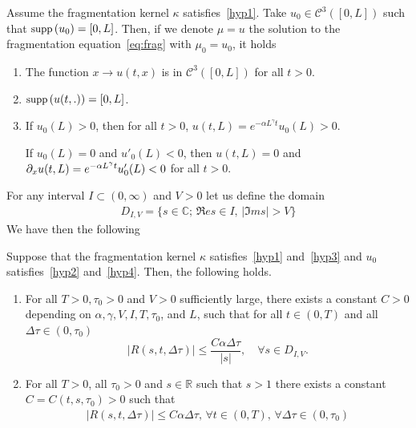 \documentclass[AHL,Unicode,longabstracts,published]{cedram}
\newcommand*\p{\partial}
\renewcommand*\a{\alpha}
\newcommand*\R{\mathbb{R}}
\newcommand*\C{\mathbb{C}}
\newcommand{\clC}{\mathcal{C}}
\newcommand*\supp{{\mbox{\small\rm supp}}\,}
\newcommand*{\relabel}{\renewcommand{\labelenumi}{(\theenumi)}}
\newcommand*{\romanenumi}{\renewcommand*{\theenumi}{\roman{enumi}}\relabel}
\let\oldforall\forall
\renewcommand*{\forall}{\mathrel{\oldforall}}
\begin{document}
\begin{lemm}\label{lemma:prop}
Assume the fragmentation kernel $\kappa$ satisfies~\eqref{hyp1}. Take $u_0 \in \clC^3([0,L])$ such that $\supp(u_0)=[0,L]$. Then, if we denote $\mu = u$ the solution to the fragmentation equation~\eqref{eq:frag} with $\mu _0=u_0$, it holds
\begin{enumerate}
\item\label{1} The function $x \to u(t,x)$ is in $\clC^3([0,L])$ for all $t>0$.
\item $\supp(u(t,.)) = [0,L]$.
\item If $u_0(L)>0$, then for all $t>0$, $u(t,L)= e^{-\a L^{\gamma}t}u_0(L)>0$.

If $u_0(L)=0$ and $u'_0(L)<0$, then $u(t,L)=0$ and $\p_x u(t,L)= e^{-\a L^{\gamma}t}u'_0(L)\linebreak<0$ for all $t>0$.
\end{enumerate}
\end{lemm}


For any interval $I\subset (0, \infty)$ and $V>0$ let us define the domain
\begin{align*}
D_{I, V}=\{s\in \C;\,\Re e s\in I,\,|\Im m s|>V \}
\end{align*}
We have then the following


\begin{theo}\label{thm:reco}
Suppose that the fragmentation kernel $\kappa $ satisfies~\eqref{hyp1} and~\eqref{hyp3} and $u_0$ satisfies~\eqref{hyp2} and~\eqref{hyp4}. Then, the following holds.
\begin{enumerate}\romanenumi
\item\label{theo4.4.1} For all $T>0, \tau _0>0$ and $V>0$ sufficiently large, there exists a constant $C>0$ depending on $\alpha, \gamma, V, I, T, \tau _0$, and $L$, such that for all $t\in (0, T)$ and all $\Delta \tau \in (0, \tau _0)$
\begin{equation}\label{thm:recoE1}
|R(s,t,\Delta \tau)|
\leq
\dfrac{C\a \Delta \tau }{|s|},
\quad \forall s\in D _{I, V}.
\end{equation}
\item\label{theo4.4.2} For all $T>0$, all $\tau _0>0$ and $s\in \R$ such that $s>1$ there exists a constant $C=C(t, s, \tau _0)>0$ such that
\begin{align}\label{thm:recoE15}
|R(s, t, \Delta \tau)|\le C\alpha \Delta \tau,\,\forall t\in (0, T),\,\forall \Delta \tau\in (0, \tau _0)
\end{align}
\end{enumerate}
\end{theo}
\end{document}
